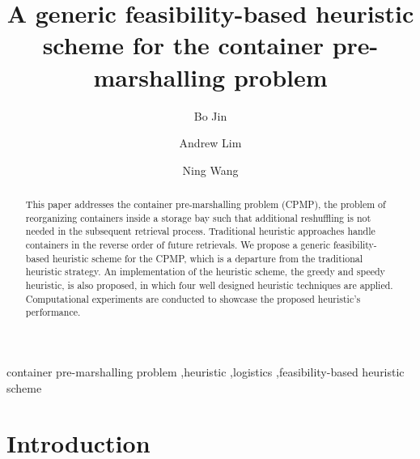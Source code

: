 \documentclass[review,3p,times,12pt,number]{elsarticle}\usepackage{amsmath}\usepackage{amssymb}
\begin{document}
\begin{frontmatter}

\title{A generic feasibility-based heuristic scheme for the container pre-marshalling problem}
\author[cityu]{Bo Jin}
\author[cityu]{Andrew Lim}

\author[shu]{Ning Wang}




\address[cityu]{Department of Management Sciences, City University of Hong Kong, Tat Chee Avenue, Kowloon Tong, Hong Kong}
\address[shu]{Department of Information Management, School of Management, Shanghai University, Shanghai, China}

\begin{abstract}

This paper addresses the container pre-marshalling problem (CPMP), the problem of reorganizing containers inside a storage bay such that additional reshuffling is not needed in the subsequent retrieval process. Traditional heuristic approaches handle containers in the reverse order of future retrievals. We propose a generic feasibility-based heuristic scheme for the CPMP, which is a departure from the traditional heuristic strategy. An implementation of the heuristic scheme, the greedy and speedy heuristic, is also proposed, in which four well designed heuristic techniques are applied. Computational experiments are conducted to showcase the proposed heuristic's performance.
\end{abstract}

\begin{keyword}
container pre-marshalling problem \sep heuristic \sep logistics \sep feasibility-based heuristic scheme
\end{keyword}
\end{frontmatter}




\section{Introduction}
\end{document}
